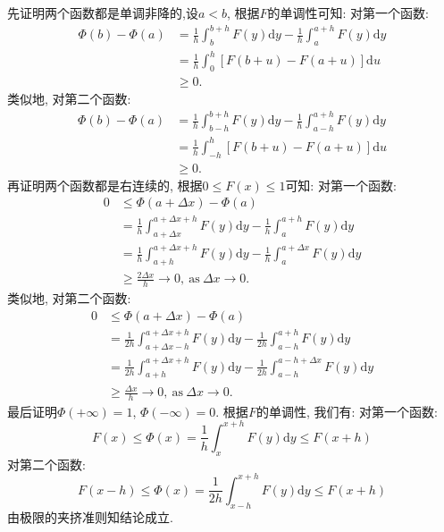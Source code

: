 \begin{yySolution}
	先证明两个函数都是单调非降的,设$a<b$, 根据$F$的单调性可知:
	对第一个函数:\begin{align}
		\varPhi(b) - \varPhi(a) &= \frac{1}{h}\int_{b}^{b+h}F(y)\mathrm{d}y - \frac{1}{h}\int_{a}^{a+h}F(y)\mathrm{d}y\nonumber\\
		&=\frac{1}{h}\int_{0}^h \left[ F(b+u)-F(a+u) \right]\mathrm{d}u\nonumber\\
		&\geqslant 0.
	\end{align}
	类似地, 对第二个函数:\begin{align}
		\varPhi(b) - \varPhi(a) &= \frac{1}{h}\int_{b-h}^{b+h}F(y)\mathrm{d}y - \frac{1}{h}\int_{a-h}^{a+h}F(y)\mathrm{d}y\nonumber\\
		&=\frac{1}{h}\int_{-h}^h \left[ F(b+u)-F(a+u) \right]\mathrm{d}u\nonumber\\
		&\geqslant 0.
	\end{align}
	再证明两个函数都是右连续的, 根据$0\leqslant F(x)\leqslant 1$可知:
	对第一个函数:\begin{align}
		0&\leqslant \varPhi(a+\Delta x) - \varPhi(a)\nonumber\\
		 &= \frac{1}{h}\int_{a+\Delta x}^{a+\Delta x+h}F(y)\mathrm{d}y - \frac{1}{h}\int_{a}^{a+h}F(y)\mathrm{d}y\nonumber\\
		&=\frac{1}{h}\int_{a+h}^{a+\Delta x+h}F(y)\mathrm{d}y - \frac{1}{h}\int_{a}^{a+\Delta x}F(y)\mathrm{d}y\nonumber\\
		&\geqslant \frac{2\Delta x}{h}\to 0,~\text{as}~\Delta x\to 0.
	\end{align}
	类似地, 对第二个函数:\begin{align}
		0&\leqslant \varPhi(a+\Delta x) - \varPhi(a)\nonumber\\
		 &= \frac{1}{2h}\int_{a+\Delta x-h}^{a+\Delta x+h}F(y)\mathrm{d}y - \frac{1}{2h}\int_{a-h}^{a+h}F(y)\mathrm{d}y\nonumber\\
		&=\frac{1}{2h}\int_{a+h}^{a+\Delta x+h}F(y)\mathrm{d}y - \frac{1}{2h}\int_{a-h}^{a-h+\Delta x}F(y)\mathrm{d}y\nonumber\\
		&\geqslant \frac{\Delta x}{h}\to 0,~\text{as}~\Delta x\to 0.
	\end{align}
	最后证明$\varPhi(+\infty) = 1$, $\varPhi(-\infty) = 0$. 根据$F$的单调性, 我们有:
	对第一个函数:\begin{equation}
		F(x)\leqslant \varPhi(x) = \frac{1}{h}\int_{x}^{x+h}F(y)\mathrm{d}y \leqslant F(x+h)
	\end{equation}
	对第二个函数:\begin{equation}
		F(x-h)\leqslant \varPhi(x) = \frac{1}{2h}\int_{x-h}^{x+h}F(y)\mathrm{d}y \leqslant F(x+h)
	\end{equation}
	由极限的夹挤准则知结论成立.
\end{yySolution}

